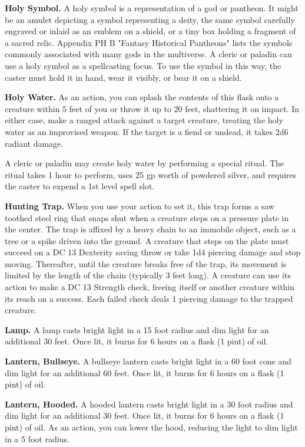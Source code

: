 \documentclass[
]{article}
\begin{document}
\textbf{Holy Symbol.} A holy symbol is a representation of a god or
pantheon. It might be an amulet depicting a symbol representing a deity,
the same symbol carefully engraved or inlaid as an emblem on a shield,
or a tiny box holding a fragment of a sacred relic. Appendix PH B
"Fantasy Historical Pantheons" lists the symbols commonly associated
with many gods in the multiverse. A cleric or paladin can use a holy
symbol as a spellcasting focus. To use the symbol in this way, the
caster must hold it in hand, wear it visibly, or bear it on a shield.

\textbf{Holy Water.} As an action, you can splash the contents of this
flask onto a creature within 5 feet of you or throw it up to 20 feet,
shattering it on impact. In either case, make a ranged attack against a
target creature, treating the holy water as an improvised weapon. If the
target is a fiend or undead, it takes 2d6 radiant damage.

A cleric or paladin may create holy water by performing a special
ritual. The ritual takes 1 hour to perform, uses 25 gp worth of powdered
silver, and requires the caster to expend a 1st level spell slot.

\textbf{Hunting Trap.} When you use your action to set it, this trap
forms a saw toothed steel ring that snaps shut when a creature steps on
a pressure plate in the center. The trap is affixed by a heavy chain to
an immobile object, such as a tree or a spike driven into the ground. A
creature that steps on the plate must succeed on a DC 13 Dexterity
saving throw or take 1d4 piercing damage and stop moving. Thereafter,
until the creature breaks free of the trap, its movement is limited by
the length of the chain (typically 3 feet long). A creature can use its
action to make a DC 13 Strength check, freeing itself or another
creature within its reach on a success. Each failed check deals 1
piercing damage to the trapped creature.

\textbf{Lamp.} A lamp casts bright light in a 15 foot radius and dim
light for an additional 30 feet. Once lit, it burns for 6 hours on a
flask (1 pint) of oil.

\textbf{Lantern, Bullseye.} A bullseye lantern casts bright light in a
60 foot cone and dim light for an additional 60 feet. Once lit, it burns
for 6 hours on a flask (1 pint) of oil.

\textbf{Lantern, Hooded.} A hooded lantern casts bright light in a 30
foot radius and dim light for an additional 30 feet. Once lit, it burns
for 6 hours on a flask (1 pint) of oil. As an action, you can lower the
hood, reducing the light to dim light in a 5 foot radius.
\end{document}
